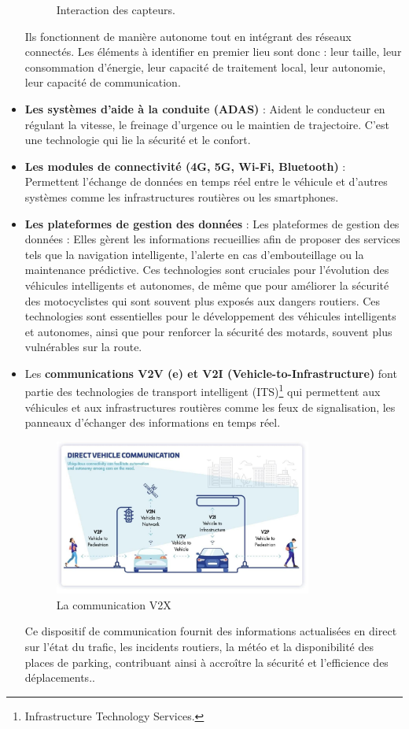 \begin{itemize}
\begin{figure}[H]
        \caption{Interaction des capteurs.}
    \end{figure}
    Ils fonctionnent de manière autonome tout en intégrant des réseaux connectés. Les éléments à identifier en premier lieu sont donc : leur taille, leur consommation d’énergie, leur capacité de traitement local, leur autonomie, leur capacité de communication.
    \item \textbf{Les systèmes d’aide à la conduite (ADAS)} : Aident le conducteur en régulant la vitesse, le freinage d’urgence ou le maintien de trajectoire. C'est une technologie qui lie la sécurité et le confort.
    \item \textbf{Les modules de connectivité (4G, 5G, Wi-Fi, Bluetooth)} : Permettent l’échange de données en temps réel entre le véhicule et d’autres systèmes comme les infrastructures routières ou les smartphones.
    \item \textbf{Les plateformes de gestion des données} : Les plateformes de gestion des données : Elles gèrent les informations recueillies afin de proposer des services tels que la navigation intelligente, l'alerte en cas d'embouteillage ou la maintenance prédictive. Ces technologies sont cruciales pour l'évolution des véhicules intelligents et autonomes, de même que pour améliorer la sécurité des motocyclistes qui sont souvent plus exposés aux dangers routiers.
Ces technologies sont essentielles pour le développement des véhicules intelligents et autonomes, ainsi que pour renforcer la sécurité des motards, souvent plus vulnérables sur la route.
    \item Les \textbf{communications V2V (e) et V2I (Vehicle-to-Infrastructure)} font partie des technologies de transport intelligent (ITS)\footnote{Infrastructure Technology Services.} qui permettent aux véhicules et aux infrastructures routières comme les feux de signalisation, les panneaux d’échanger des informations en temps réel.

    \begin{figure}[H]
        \centering
        \includegraphics[width=0.8\textwidth]{images/schema_v2.png} 
        \caption{La communication V2X}
    \end{figure}

Ce dispositif de communication fournit des informations actualisées en direct sur l'état du trafic, les incidents routiers, la météo et la disponibilité des places de parking, contribuant ainsi à accroître la sécurité et l'efficience des déplacements.\cite{joberty_blog}.\\

\end{itemize}
\vspace{0.5cm}

